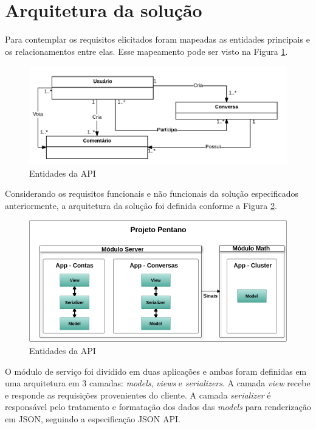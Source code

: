 \section{Arquitetura da solução}

Para contemplar os requisitos elicitados foram mapeadas as entidades principais e os relacionamentos entre elas. 
Esse mapeamento pode ser visto na Figura \ref{fig:entidades}.

\begin{figure}[h!]
\centering
\includegraphics[scale=0.5]{figuras/entidades.png}
\caption{Entidades da API}
\label{fig:entidades}
\end{figure}

Considerando os requisitos funcionais e não funcionais da solução especificados anteriormente, a arquitetura da solução foi definida 
conforme a Figura \ref{fig:arquitetura_api}.

\begin{figure}[h!]
\centering
\includegraphics[scale=0.5]{figuras/arquitetura_api.png}
\caption{Entidades da API}
\label{fig:arquitetura_api}
\end{figure}

O módulo de serviço foi dividido em duas aplicações e ambas foram definidas em uma arquitetura
em 3 camadas: \textit{models}, \textit{views} e \textit{serializers}. 
A camada \textit{view} recebe e responde as requisições provenientes do cliente.
A camada \textit{serializer} é responsável pelo tratamento e formatação dos dados das \textit{models}
para renderização em JSON, seguindo a especificação JSON API.

